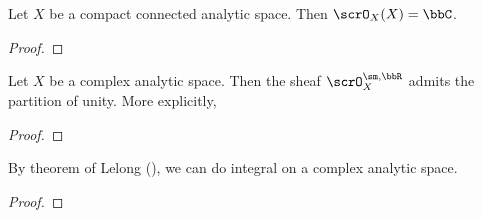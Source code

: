 \begin{proposition}
	Let $X$ be a compact connected analytic space.
	Then $\scrO_X(X) = \bbC$.
\end{proposition}
\begin{proof}
	\Yang{}
\end{proof}


\begin{theorem}\label{thm:partition-of-unity-on-analytic-space}
	Let $X$ be a complex analytic space.
	Then the sheaf $\scrO_X^{\sm,\bbR}$ admits the partition of unity.
	More explicitly, \Yang{}
\end{theorem}
\begin{proof}
	\Yang{}
\end{proof}

\begin{theorem}
  By theorem of Lelong (\cite[Theorem 3.2.26]{Barlet-Magnusson-2019-ComplexAnalyticCycles}), we can do integral on a complex analytic space.
  \Yang{}
\end{theorem}
\begin{proof}
  \Yang{}
\end{proof}






